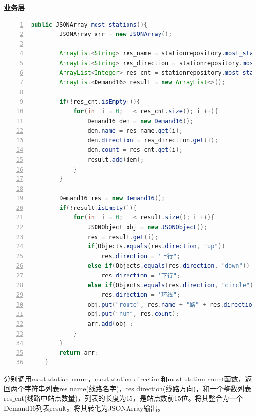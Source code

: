 \documentclass[11pt,a4paper]{article}
\begin{document}
\textbf{业务层} \\
\begin{lstlisting}[numbers = left, 
showstringspaces=false,
showspaces = false,
breaklines = true, 
language=Java]
	public JSONArray most_stations(){
        JSONArray arr = new JSONArray();

        ArrayList<String> res_name = stationrepository.most_station_name();
        ArrayList<String> res_direction = stationrepository.most_station_direction();
        ArrayList<Integer> res_cnt = stationrepository.most_station_count();
        ArrayList<Demand16> result = new ArrayList<>();

        if(!res_cnt.isEmpty()){
            for(int i = 0; i < res_cnt.size(); i ++){
                Demand16 dem = new Demand16();
                dem.name = res_name.get(i);
                dem.direction = res_direction.get(i);
                dem.count = res_cnt.get(i);
                result.add(dem);
            }
        }

        Demand16 res = new Demand16();
        if(!result.isEmpty()){
            for(int i = 0; i < result.size(); i ++){
                JSONObject obj = new JSONObject();
                res = result.get(i);
                if(Objects.equals(res.direction, "up"))
                    res.direction = "上行";
                else if(Objects.equals(res.direction, "down"))
                    res.direction = "下行";
                else if(Objects.equals(res.direction, "circle"))
                    res.direction = "环线";
                obj.put("route", res.name + "路" + res.direction);
                obj.put("num", res.count);
                arr.add(obj);
            }
        }
        return arr;
    }
\end{lstlisting} 
分别调用most$\_$station$\_$name，most$\_$station$\_$direction和most$\_$station$\_$count函数，返回两个字符串列表res$\_$name(线路名字)，res$\_$direction(线路方向)，和一个整数列表res$\_$cnt(线路中站点数量)，列表的长度为15，是站点数前15位。将其整合为一个Demand16列表result。将其转化为JSONArray输出。
\end{document}
